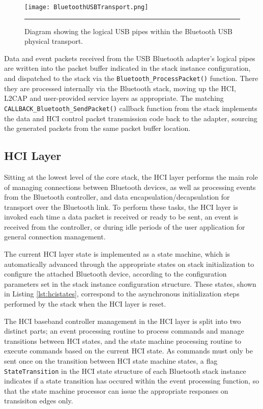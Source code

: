 \begin{figure}[tbph]
	\vspace{1em}
	\centering
		\texttt{[image: BluetoothUSBTransport.png]}
	\rule{35em}{0.5pt}
	\caption[Diagram of the logical pipes within the Bluetooth USB transport.]{Diagram showing the logical USB pipes within the Bluetooth USB physical transport.}
	\label{fig:btusbtransport}
\end{figure}

Data and event packets received from the USB Bluetooth adapter's logical pipes are written into the packet buffer indicated in the stack instance configuration, and dispatched to the stack via the \lstinline{Bluetooth_ProcessPacket()} function. There they are processed internally via the Bluetooth stack, moving up the HCI, L2CAP and user-provided service layers as appropriate. The matching \lstinline{CALLBACK_Bluetooth_SendPacket()} callback function from the stack implements the data and HCI control packet transmission code back to the adapter, sourcing the generated packets from the same packet buffer location.

\FloatBarrier
\subsection{HCI Layer}

Sitting at the lowest level of the core stack, the HCI layer performs the main role of managing connections between Bluetooth devices, as well as processing events from the Bluetooth controller, and data encapsulation/decapsulation for transport over the Bluetooth link. To perform these tasks, the HCI layer is invoked each time a data packet is received or ready to be sent, an event is received from the controller, or during idle periods of the user application for general connection management.

The current HCI layer state is implemented as a state machine, which is automatically advanced through the appropriate states on stack initialization to configure the attached Bluetooth device, according to the configuration parameters set in the stack instance configuration structure. These states, shown in Listing \ref{lst:hcistates}, correspond to the asynchronous initialization steps performed by the stack when the HCI layer is reset.



The HCI baseband controller management in the HCI layer is split into two distinct parts; an event processing routine to process commands and manage transitions between HCI states, and the state machine processing routine to execute commands based on the current HCI state. As commands must only be sent once on the transition between HCI state machine states, a flag \lstinline{StateTransition} in the HCI state structure of each Bluetooth stack instance indicates if a state transition has occured within the event processing function, so that the state machine processor can issue the appropriate responses on transisiton edges only.

